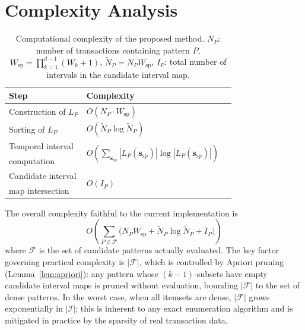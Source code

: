 \section{Complexity Analysis}
\label{sec:complexity_appendix}

\begin{table}[h]
\centering
\caption{Computational complexity of the proposed method.
$N_P$: number of transactions containing pattern $P$,
$W_{\mathrm{sp}} = \prod_{k=1}^{d-1} (W_k + 1)$,
$\widetilde N_P = N_P W_{\mathrm{sp}}$,
$I_P$: total number of intervals in the candidate interval map.}
\label{tab:complexity}
\small
\begin{tabular}{lll}
\toprule
Step & Complexity \\
\midrule
Construction of $L_P$ & $O(N_P \cdot W_{\mathrm{sp}})$ \\
Sorting of $L_P$ & $O(\widetilde N_P \log \widetilde N_P)$ \\
Temporal interval & \multirow{2}{*}{$O\!\left(\sum_{\bm{s}_{\mathrm{sp}}}|L_P(\bm{s}_{\mathrm{sp}})| \log |L_P(\bm{s}_{\mathrm{sp}})|\right)$} \\
\quad computation & \\
Candidate interval & \multirow{2}{*}{$O(I_P)$} \\
\quad map intersection & \\
\bottomrule
\end{tabular}
\end{table}

The overall complexity faithful to the current implementation is
\[
  O\!\left(
    \sum_{P \in \mathcal{F}}
      \bigl(
        N_P W_{\mathrm{sp}}
        +
        \widetilde N_P \log \widetilde N_P
        +
        I_P
      \bigr)
  \right)
\]
where $\mathcal{F}$ is the set of candidate patterns actually evaluated.
The key factor governing practical complexity is $|\mathcal{F}|$,
which is controlled by Apriori pruning (Lemma~\ref{lem:apriori}):
any pattern whose $(k{-}1)$-subsets have empty candidate interval maps is pruned
without evaluation, bounding $|\mathcal{F}|$ to the set of dense patterns.
In the worst case, when all itemsets are dense,
$|\mathcal{F}|$ grows exponentially in $|\mathcal{I}|$;
this is inherent to any exact enumeration algorithm and is
mitigated in practice by the sparsity of real transaction data.

